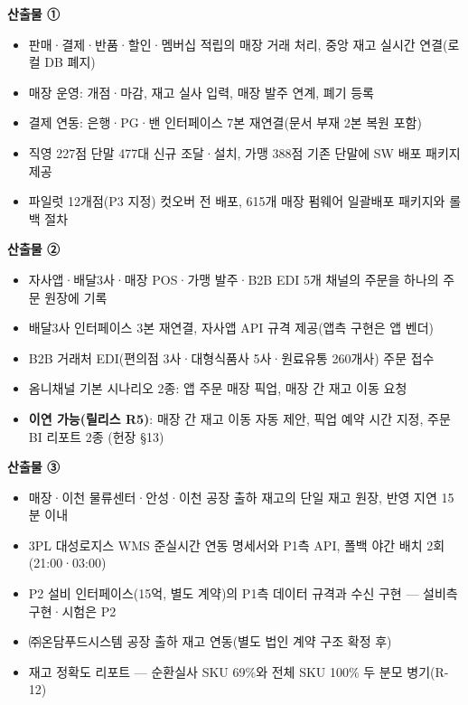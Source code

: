 \documentclass[10pt,a4paper]{article}
\begin{document}
\begin{fieldbox}
\textbf{산출물 ①} 
\ifwbblank{}\else
\begin{itemize}
\item 판매·결제·반품·할인·멤버십 적립의 매장 거래 처리, 중앙 재고 실시간 연결(로컬 DB 폐지)
\item 매장 운영: 개점·마감, 재고 실사 입력, 매장 발주 연계, 폐기 등록
\item 결제 연동: 은행·PG·밴 인터페이스 7본 재연결(문서 부재 2본 복원 포함)
\item 직영 227점 단말 477대 신규 조달·설치, 가맹 388점 기존 단말에 SW 배포 패키지 제공
\item 파일럿 12개점(P3 지정) 컷오버 전 배포, 615개 매장 펌웨어 일괄배포 패키지와 롤백 절차
\end{itemize}\fi
\end{fieldbox}
\begin{fieldbox}
\textbf{산출물 ②} 
\ifwbblank{}\else
\begin{itemize}
\item 자사앱·배달3사·매장 POS·가맹 발주·B2B EDI 5개 채널의 주문을 하나의 주문 원장에 기록
\item 배달3사 인터페이스 3본 재연결, 자사앱 API 규격 제공(앱측 구현은 앱 벤더)
\item B2B 거래처 EDI(편의점 3사·대형식품사 5사·원료유통 260개사) 주문 접수
\item 옴니채널 기본 시나리오 2종: 앱 주문 매장 픽업, 매장 간 재고 이동 요청
\item \textbf{이연 가능(릴리스 R5)}: 매장 간 재고 이동 자동 제안, 픽업 예약 시간 지정, 주문 BI 리포트 2종 (헌장 §13)
\end{itemize}\fi
\end{fieldbox}
\begin{fieldbox}
\textbf{산출물 ③} 
\ifwbblank{}\else
\begin{itemize}
\item 매장·이천 물류센터·안성·이천 공장 출하 재고의 단일 재고 원장, 반영 지연 15분 이내
\item 3PL 대성로지스 WMS 준실시간 연동 명세서와 P1측 API, 폴백 야간 배치 2회(21:00·03:00)
\item P2 설비 인터페이스(15억, 별도 계약)의 P1측 데이터 규격과 수신 구현 — 설비측 구현·시험은 P2
\item ㈜온담푸드시스템 공장 출하 재고 연동(별도 법인 계약 구조 확정 후)
\item 재고 정확도 리포트 — 순환실사 SKU 69\%와 전체 SKU 100\% 두 분모 병기(R-12)
\end{itemize}\fi
\end{fieldbox}
\end{document}
